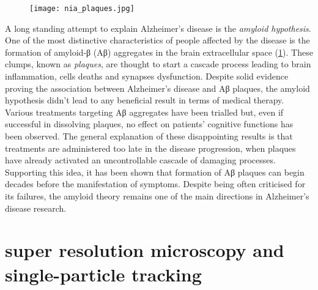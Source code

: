 \begin{figure}
  \label{fig:plaques}
  \texttt{[image: nia\_plaques.jpg]}
\end{figure}

A long standing attempt to explain Alzheimer’s disease is the \emph{amyloid hypothesis}. One of the most distinctive characteristics of people affected by the disease is the formation of amyloid-β (Aβ) aggregates in the brain extracellular space (\cref{fig:plaques}).
These clumps, known as \emph{plaques}, are thought to start a cascade process leading to brain inflammation, cells deaths and synapses dysfunction. Despite solid evidence proving the association between Alzheimer's disease and Aβ plaques, the amyloid hypothesis didn't lead to any beneficial result in terms of medical therapy. Various treatments targeting Aβ aggregates have been trialled but, even if successful in dissolving plaques, no effect on patients' cognitive functions has been observed. The general explanation of these disappointing results is that treatments are administered too late in the disease progression, when plaques have already activated an uncontrollable cascade of damaging processes. Supporting this idea, it has been shown that formation of Aβ plaques can begin decades before the manifestation of symptoms. Despite being often criticised for its failures, the amyloid theory remains one of the main directions in Alzheimer's disease research.


\section{super resolution microscopy and single-particle tracking}

